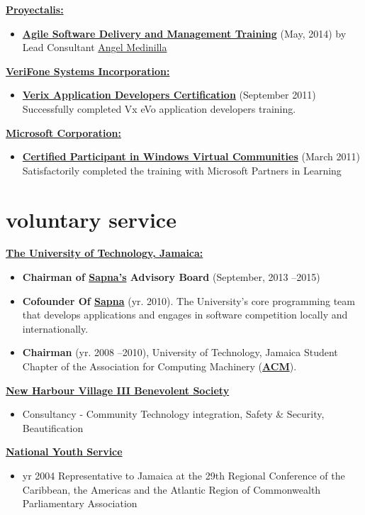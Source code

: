 \documentclass[]{friggeri-cvRS}
\begin{document}
\textbf{\underline{Proyectalis:}}
	\begin{itemize}
		\item \textbf{\href{http://www.proyectalis.com/en/servicios/}{Agile Software Delivery and Management Training}} (May, 2014) by Lead Consultant \href{http://www.proyectalis.com/en/angelmedinilla/}{Angel Medinilla}
	\end{itemize}
\textbf{\underline{VeriFone Systems Incorporation:}}
	\begin{itemize}
		\item \textbf{\href{https://www.verifonedevnet.com/verifone/devnet/dnHome.do}{Verix Application Developers Certification}} (September 2011) Successfully completed Vx eVo application developers training.
	\end{itemize}
\textbf{\underline{Microsoft Corporation:}}
	\begin{itemize}
		\item \textbf{\href{https://mva.microsoft.com/}{Certified Participant in Windows Virtual Communities}} (March 2011) Satisfactorily completed the training with Microsoft Partners in Learning
	\end{itemize}


\section{voluntary service}
\textbf{\underline{The University of Technology, Jamaica:}}
	\begin{itemize}
		\item \textbf{Chairman of \href{https://www.utechsapna.com/home/about}{Sapna's} Advisory Board} (September, 2013 –2015)
		\item \textbf{Cofounder Of \href{https://www.utechsapna.com/home/about}{Sapna}} (yr. 2010). The University’s core programming team that develops applications and engages in software competition locally and internationally.
		\item \textbf{Chairman} (yr. 2008 –2010), University of Technology, Jamaica Student Chapter of the Association for Computing Machinery (\textbf{\href{http://www.acm.org/}{ACM}}).
	\end{itemize}
\textbf{\underline{New Harbour Village III Benevolent Society}}
	\begin{itemize}
		\item Consultancy - Community Technology integration, Safety \& Security, Beautification
	\end{itemize}
\textbf{\underline{National Youth Service}}
	\begin{itemize}
		\item yr 2004 Representative to Jamaica at the 29th Regional Conference of the Caribbean, the Americas and the Atlantic Region of Commonwealth Parliamentary Association
	\end{itemize}
\end{document}
